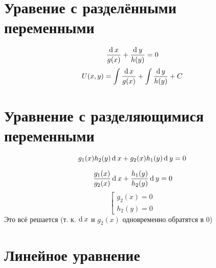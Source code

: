 \section{Уравение с разделёнными переменными}

$$ \frac{\di x}{g(x)} + \frac{\di y}{h(y)} = 0 $$
$$ U(x, y) = \ufint{g(x)} + \ufint[y]{h(y)} + C $$

\section{Уравнение с разделяющимися переменными}

$$ g_1(x)h_2(y)\di x + g_2(x)h_1(y)\di y = 0 $$
\antlersimp
\begin{multicols}{2}
    $$ \frac{g_1(x)}{g_2(x)}\di x + \frac{h_1(y)}{h_2(y)}\di y = 0 $$
    \columnbreak
    $$ \left[
    \begin{aligned}
        g_2(x) = 0 \\
        h_2(y) = 0
    \end{aligned} \right. $$
    Это всё решается (т. к. $ \di x $ и $ g_2(x) $ одновременно обратятся в 0)
\end{multicols}

\section{Линейное уравнение}

